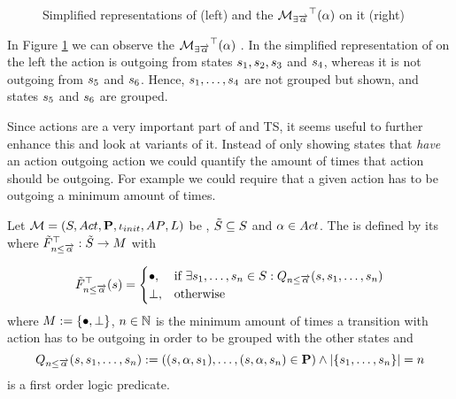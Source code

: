 \documentclass[preview]{standalone}
\begin{document}
\begin{figure}[!htb]
	\begin{minipage}{.5\textwidth}
		\hspace{5mm}
		
	\end{minipage}%
	\begin{minipage}{.5\textwidth}
		\hspace{5mm}
		
	\end{minipage}
	\caption{Simplified representations of \mdp (left) and the \viewN ${{{{{\mathcal{M}}}}_{{\exists{\overrightarrow{\ensuremath{{\alpha}}}}}}}^{\top}}({\alpha})$ on it (right)}
	\label{fig:outActHasAfter} 
\end{figure}
\begin{exmp}
	In Figure \ref{fig:outActHasAfter} we can observe the \viewN ${{{{{\mathcal{M}}}}_{{\exists{\overrightarrow{\ensuremath{{\alpha}}}}}}}^{\top}}({\alpha})$ \chgph. In the simplified representation of \achgphN on the left the action \action is outgoing from states ${s}_1, {s}_2, {s}_3$ and ${s}_4$, whereas it is not outgoing from ${s}_5$ and ${s}_6$. Hence, ${s}_1, \dots, {s}_4$ are not grouped but shown, and states ${s}_5$ and ${s}_6$ are grouped.
\end{exmp}

Since actions are a very important part of \chgphsN and TS, it seems useful to further enhance this \viewN and look at variants of it. Instead of only showing states that \emph{have} an action outgoing action we could quantify the amount of times that action should be outgoing. For example we could require that a given action has to be outgoing a minimum amount of times. 

\pagebreak

\begin{definition}	
	Let ${{{\mathcal{M}}}} = {{({S}, {Act}, {\textbf{P}}, {\iota_{init}}, {AP}, {L})}}$ be \achgphN, ${\tilde{{S}}} \subseteq {S}$ and ${\alpha} \in {Act}$. The \viewN \viewminoutaction is defined by its \grpfctN \gfctminoutaction where ${{\tilde{F}_{{{n}\leq{\overrightarrow{\ensuremath{{\alpha}}}}}}}^{\top}} : {\tilde{{S}}} \to {\ensuremath{{M}}}$ with

	\[
	{{\tilde{F}_{{{n}\leq{\overrightarrow{\ensuremath{{\alpha}}}}}}}^{\top}}({s}) =
	\begin{cases}
			{\bullet},				& \text{if } \exists {s}_1, \dots, {s}_{n} \in {S}: {Q_{{n}\leq{\overrightarrow{\ensuremath{{\alpha}}}}}({s},{s}_1, \dots, {s}_{{n}})}\\
			{\bot},     	& \text{otherwise}
		\end{cases}
	\]
	where ${{M}} := {\{{\bullet}, {\bot}\}}$,
	 ${n} \in {\mathbb{N}}$ is the minimum amount of times a transition with action \action has to be outgoing in order to be grouped with the other states and
	\[
	{Q_{{n}\leq{\overrightarrow{\ensuremath{{\alpha}}}}}({s},{s}_1, \dots, {s}_{{n}})} := (({s}, {\alpha}, {s}_1), \dots, ({s}, {\alpha}, {s}_{n}) \in {\ensuremath{{\textbf{P}}}}) \land |\{{s}_1, \dots, {s}_{n}\}| = {n}
	\]
	is a first order logic predicate.
	\label{def:minoutaction}
\end{definition}
\end{document}
